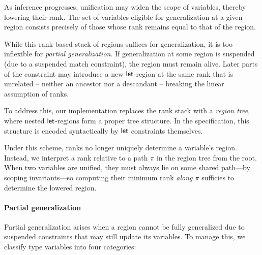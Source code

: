 \documentclass[acmsmall,screen,nonacm,review]{acmart}
\begin{document}
As inference progresses, unification may widen the scope of variables,
thereby lowering their rank. The set of variables eligible for
generalization at a given region consists precisely of those
whose rank remains equal to that of the region.


While this rank-based stack of regions suffices for \ML generalization,
it is too inflexible for \emph{partial generalization}. If generalization
at some region is suspended (\eg due to a suspended match constraint),
the region must remain alive. Later parts of the constraint may
introduce a new $\mathopen{}\mathrel{\mathsf{let}}$-region at the same rank that is unrelated --
neither an ancestor nor a descandant -- breaking the linear assumption
of ranks.

To address this, our implementation replaces the rank stack
with a \emph{region tree}, where nested $\mathopen{}\mathrel{\mathsf{let}}$-regions form
a proper tree structure. In the specification, this structure
is encoded syntactically by $\mathopen{}\mathrel{\mathsf{let}}$ constraints themselves.


Under this scheme, ranks no longer uniquely determine a variable's
region. Instead, we interpret a rank relative to a path $\pi$ in the
region tree from the root. When two variables are unified, they must
always lie on some shared path---by scoping invariants---so computing
their minimum rank \emph{along $\pi$} sufficies to determine the
lowered region.


\paragraph{Partial generalization}

Partial generalization arises when a region cannot be fully
generalized due to suspended constraints that may still update
its variables. To manage this, we classify type variables
into four categories:
\end{document}
